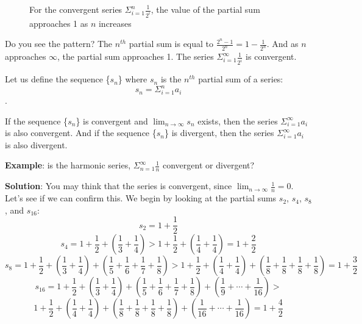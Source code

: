 \begin{figure}[htbp]
\centering
    \caption{For the convergent series $\Sigma_{i=1}^n \frac{1}{2^i}$, 
    the value of the partial sum approaches 1 as $n$ increases}
    \label{fig:convsum}
\end{figure}

Do you see the pattern? The $n^{th}$ partial sum is equal to 
$\frac{2^n - 1}{2^n} = 1 - \frac{1}{2^n}$. And as $n$ approaches 
$\infty$, the partial sum approaches 1. The series $\Sigma_{i=1}^\infty 
\frac{1}{2^i}$ is convergent. 

Let us define the sequence \{$s_n$\} where $s_n$ is the $n^{th}$ 
partial sum of a series:
$$s_n = \Sigma_{i=1}^n a_i$$. 

If the sequence \{$s_n$\} is convergent and $\lim_{n \to \infty} s_n$ 
exists, then the series $\Sigma_{i=1}^\infty a_i$ is also convergent. 
And if the sequence \{$s_n$\} is divergent, then the series 
$\Sigma_{i=1}^\infty a_i$ is also divergent.

\textbf{Example}: is the harmonic series, $\Sigma_{n = 1}^\infty \frac{1}{n}$ 
convergent or divergent?

\textbf{Solution}: You may think that the series is convergent, since $\lim_
{n \to \infty} \frac{1}{n} = 0$. Let's see if we can confirm this. We begin by 
looking at the partial sums $s_2$, $s_4$, $s_8$, and $s_16$:
$$s_2 = 1 + \frac{1}{2}$$
$$s_4 = 1 + \frac{1}{2} + \left(\frac{1}{3} + \frac{1}{4} \right) > 1 + 
\frac{1}{2} + \left( \frac{1}{4} + \frac{1}{4} \right) = 1 + \frac{2}{2}$$
$$s_8 = 1 + \frac{1}{2} + \left(\frac{1}{3} + \frac{1}{4} \right) + \left( 
\frac{1}{5} + \frac{1}{6} + \frac{1}{7} + \frac{1}{8} \right) > 1 + \frac{1}{2} 
+ \left(\frac{1}{4} + \frac{1}{4} \right) + \left( \frac{1}{8} + \frac{1}{8} + 
\frac{1}{8} + \frac{1}{8} \right) = 1 + \frac{3}{2}$$
$$s_{16} = 1 + \frac{1}{2} + \left(\frac{1}{3} + \frac{1}{4} \right) + \left( 
\frac{1}{5} + \frac{1}{6} + \frac{1}{7} + \frac{1}{8} \right) + \left(
\frac{1}{9} + \cdots + \frac{1}{16} \right) > $$
$$1 + \frac{1}{2} + \left(\frac{1}{4} + \frac{1}{4} \right) + \left( 
\frac{1}{8} + \frac{1}{8} + \frac{1}{8} + \frac{1}{8} \right) + \left(
\frac{1}{16} + \cdots + \frac{1}{16} \right) = 1 + \frac{4}{2}$$

